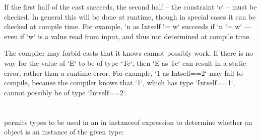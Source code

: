 If the first half of the cast succeeds, the second half -- the constraint
\xcd`{c}` -- must be checked.  In general this will be done at runtime, though
in special cases it can be checked at compile time.   For example, 
\xcd`n as Int{self != w}` succeeds if \xcd`n != w` --- even if \xcd`w` is a value
read from input, and thus not determined at compile time.

The compiler may forbid casts that it knows cannot possibly work. If there is
no way for the value of \xcd`E` to be of type \xcd`T{c}`, then 
\xcd`E as T{c}` can result in a static error, rather than a runtime error.  
For example, \xcd`1 as Int{self==2}` may fail to compile, because the compiler
knows that \xcd`1`, which has type \xcd`Int{self==1}`, cannot possibly be of
type \xcd`Int{self==2}`. 









\section{}
\label{instanceOf}

\Xten{} permits types to be used in an in instanceof expression
to determine whether an object is an instance of the given type:

